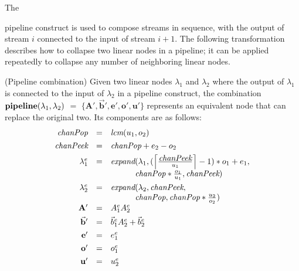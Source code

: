 \documentclass{sig-alternate}
\begin{document}
The {pipeline construct is used to compose streams in sequence,
with the output of stream $i$ connected to the input of stream $i+1$.
The following transformation describes how to collapse two linear
nodes in a pipeline; it can be applied repeatedly to collapse
any number of neighboring linear nodes.

\begin{transformation} (Pipeline combination)
Given two linear nodes $\lambda_1$ and $\lambda_2$ where the output of
$\lambda_1$ is connected to the input of $\lambda_2$ in a pipeline
construct, the combination $\mbox{\bf pipeline}(\lambda_1, \lambda_2)$ $=$
$\{\mathbf{A}', \vec{\mathbf{b}}', \mathbf{e}', \mathbf{o}', \mathbf{u}'\}$ 
represents an equivalent node that
can replace the original two.  Its components are as follows:
\begin{equation} \nonumber
\begin{array}{rcl}
\mt{chanPop} & = & \mt{lcm}(u_1, o_2) \\ ~ \vspace{-8pt} \\
\mt{chanPeek} & = & \mt{chanPop} + e_2 - o_2 \\ ~ \vspace{-8pt} \\
\lambda_1^e & = & \mt{expand}(\lambda_1, (\left \lceil \frac{\mt{chanPeek}}{u_1} \right \rceil - 1) * o_1 + e_1, \\
~ & ~ & ~\hspace{0.32in}~ \mt{chanPop} * \frac{o_1}{u_1}, \mt{chanPeek}) \\ ~ \vspace{-8pt} \\
\lambda_2^e & = & \mt{expand}(\lambda_2, \mt{chanPeek}, \\
~ & ~ & ~\hspace{0.32in}~ \mt{chanPop}, \mt{chanPop} * \frac{u_2}{o_2}) \\
\mathbf{A'} & = & A_1^e A_2^e \\ ~ \vspace{-8pt} \\
\vec{\mathbf{b}}' & = & {\vec b}_1^e A_2^e + {\vec b}_2^e \\ ~ \vspace{-8pt} \\
\mathbf{e'} & = & e_1^e \\ ~ \vspace{-8pt} \\
\mathbf{o'} & = & o_1^e \\ ~ \vspace{-8pt} \\
\mathbf{u'} & = & u_2^e
\end{array}
\end{equation}
\end{transformation}

}
\end{document}
